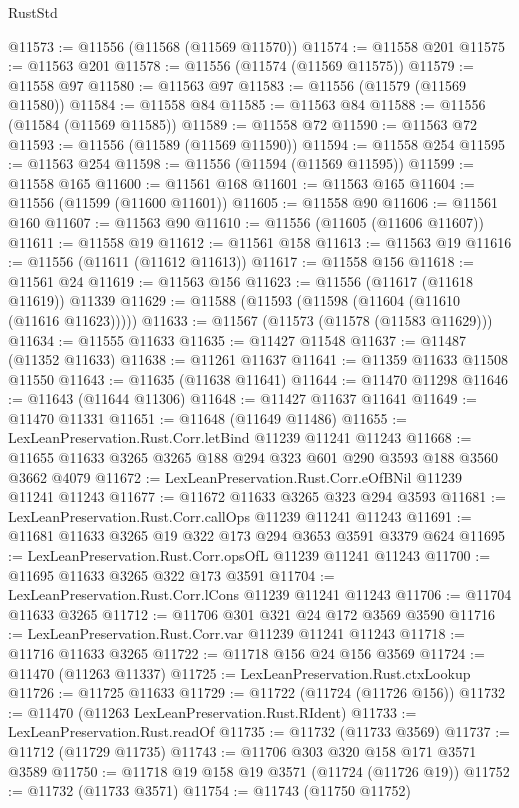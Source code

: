 \begin{lexlean}{RustStd}
\begin{coremodule}
@11573 := @11556 (@11568 (@11569 @11570))
@11574 := @11558 @201
@11575 := @11563 @201
@11578 := @11556 (@11574 (@11569 @11575))
@11579 := @11558 @97
@11580 := @11563 @97
@11583 := @11556 (@11579 (@11569 @11580))
@11584 := @11558 @84
@11585 := @11563 @84
@11588 := @11556 (@11584 (@11569 @11585))
@11589 := @11558 @72
@11590 := @11563 @72
@11593 := @11556 (@11589 (@11569 @11590))
@11594 := @11558 @254
@11595 := @11563 @254
@11598 := @11556 (@11594 (@11569 @11595))
@11599 := @11558 @165
@11600 := @11561 @168
@11601 := @11563 @165
@11604 := @11556 (@11599 (@11600 @11601))
@11605 := @11558 @90
@11606 := @11561 @160
@11607 := @11563 @90
@11610 := @11556 (@11605 (@11606 @11607))
@11611 := @11558 @19
@11612 := @11561 @158
@11613 := @11563 @19
@11616 := @11556 (@11611 (@11612 @11613))
@11617 := @11558 @156
@11618 := @11561 @24
@11619 := @11563 @156
@11623 := @11556 (@11617 (@11618 @11619)) @11339
@11629 := @11588 (@11593 (@11598 (@11604 (@11610 (@11616 @11623)))))
@11633 := @11567 (@11573 (@11578 (@11583 @11629)))
@11634 := @11555 @11633
@11635 := @11427 @11548
@11637 := @11487 (@11352 @11633)
@11638 := @11261 @11637
@11641 := @11359 @11633 @11508 @11550
@11643 := @11635 (@11638 @11641)
@11644 := @11470 @11298
@11646 := @11643 (@11644 @11306)
@11648 := @11427 @11637 @11641
@11649 := @11470 @11331
@11651 := @11648 (@11649 @11486)
@11655 := LexLeanPreservation.Rust.Corr.letBind @11239 @11241 @11243
@11668 := @11655 @11633 @3265 @3265 @188 @294 @323 @601 @290 @3593 @188 @3560 @3662 @4079
@11672 := LexLeanPreservation.Rust.Corr.eOfBNil @11239 @11241 @11243
@11677 := @11672 @11633 @3265 @323 @294 @3593
@11681 := LexLeanPreservation.Rust.Corr.callOps @11239 @11241 @11243
@11691 := @11681 @11633 @3265 @19 @322 @173 @294 @3653 @3591 @3379 @624
@11695 := LexLeanPreservation.Rust.Corr.opsOfL @11239 @11241 @11243
@11700 := @11695 @11633 @3265 @322 @173 @3591
@11704 := LexLeanPreservation.Rust.Corr.lCons @11239 @11241 @11243
@11706 := @11704 @11633 @3265
@11712 := @11706 @301 @321 @24 @172 @3569 @3590
@11716 := LexLeanPreservation.Rust.Corr.var @11239 @11241 @11243
@11718 := @11716 @11633 @3265
@11722 := @11718 @156 @24 @156 @3569
@11724 := @11470 (@11263 @11337)
@11725 := LexLeanPreservation.Rust.ctxLookup
@11726 := @11725 @11633
@11729 := @11722 (@11724 (@11726 @156))
@11732 := @11470 (@11263 LexLeanPreservation.Rust.RIdent)
@11733 := LexLeanPreservation.Rust.readOf
@11735 := @11732 (@11733 @3569)
@11737 := @11712 (@11729 @11735)
@11743 := @11706 @303 @320 @158 @171 @3571 @3589
@11750 := @11718 @19 @158 @19 @3571 (@11724 (@11726 @19))
@11752 := @11732 (@11733 @3571)
@11754 := @11743 (@11750 @11752)

\end{coremodule}
\end{lexlean}
